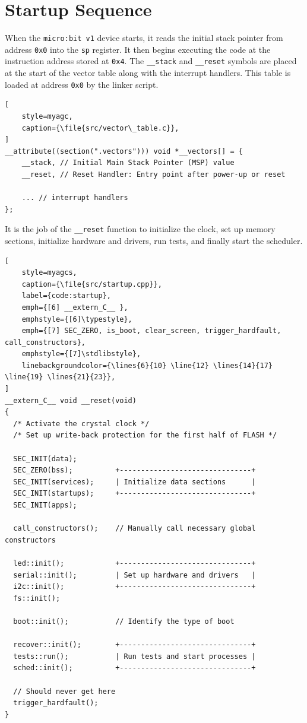 \section{Startup Sequence}
\label{sec:rec_init}
\label{sec:startup}

When the \texttt{micro:bit v1} device starts, it reads the initial stack pointer from
address \lstinline[style=myagc]|0x0| into the \lstinline[style=myagc]|sp| register. It
then begins executing the code at the instruction address stored at
\lstinline[style=myagc]|0x4|. The \lstinline[style=myagc]|__stack| and
\lstinline[style=myagc]|__reset| symbols are placed at the start of the vector table
along with the interrupt handlers. This table is loaded at address
\lstinline[style=myagc]|0x0| by the linker script.

\begin{lstlisting}[
    style=myagc,
    caption={\file{src/vector\_table.c}},
]
__attribute((section(".vectors"))) void *__vectors[] = {
    __stack, // Initial Main Stack Pointer (MSP) value
    __reset, // Reset Handler: Entry point after power-up or reset

    ... // interrupt handlers
};
\end{lstlisting}

It is the job of the \lstinline[style=myagc]|__reset| function to initialize the clock,
set up memory sections, initialize hardware and drivers, run tests, and finally start
the scheduler.

\begin{lstlisting}[
    style=myagcs,
    caption={\file{src/startup.cpp}},
    label={code:startup},
    emph={[6] __extern_C__ },
    emphstyle={[6]\typestyle},
    emph={[7] SEC_ZERO, is_boot, clear_screen, trigger_hardfault, call_constructors},
    emphstyle={[7]\stdlibstyle},
    linebackgroundcolor={\lines{6}{10} \line{12} \lines{14}{17} \line{19} \lines{21}{23}},
]
__extern_C__ void __reset(void)
{
  /* Activate the crystal clock */
  /* Set up write-back protection for the first half of FLASH */

  SEC_INIT(data);         
  SEC_ZERO(bss);          +-------------------------------+
  SEC_INIT(services);     | Initialize data sections      |
  SEC_INIT(startups);     +-------------------------------+
  SEC_INIT(apps);

  call_constructors();    // Manually call necessary global constructors

  led::init();            +-------------------------------+
  serial::init();         | Set up hardware and drivers   |
  i2c::init();            +-------------------------------+
  fs::init();             

  boot::init();           // Identify the type of boot

  recover::init();        +-------------------------------+
  tests::run();           | Run tests and start processes |
  sched::init();          +-------------------------------+

  // Should never get here
  trigger_hardfault();
}
\end{lstlisting}

